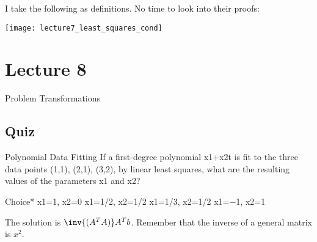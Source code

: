 \documentclass[../main.tex]{subfiles}
\begin{document}
\begin{definition}
    I take the following as definitions. No time to look into their proofs:
    \begin{center}
        \texttt{[image: lecture7\_least\_squares\_cond]}
    \end{center}
\end{definition}


\section{Lecture 8}{Problem Transformations}

\subsection{Quiz}

\begin{problem}{1}
Polynomial Data Fitting
If a first-degree polynomial x1+x2t is fit to the three data points (1,1), (2,1), (3,2), by linear least squares, what are the resulting values of the parameters x1 and x2?

Choice*
x1=1, x2=0
x1=1/2, x2=1/2
x1=1/3, x2=1/2
x1=−1, x2=1
\end{problem}
\begin{solution}
The solution is $\inv{(A^TA)}A^Tb$. Remember that the inverse of a general matrix is
$x^2$.
\end{solution}
\end{document}
